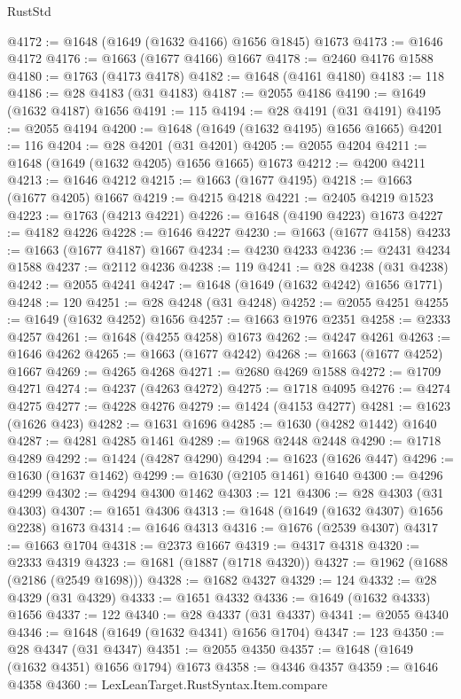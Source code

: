 \begin{lexlean}{RustStd}
\begin{coremodule}
@4172 := @1648 (@1649 (@1632 @4166) @1656 @1845) @1673
@4173 := @1646 @4172
@4176 := @1663 (@1677 @4166) @1667
@4178 := @2460 @4176 @1588
@4180 := @1763 (@4173 @4178)
@4182 := @1648 (@4161 @4180)
@4183 := 118
@4186 := @28 @4183 (@31 @4183)
@4187 := @2055 @4186
@4190 := @1649 (@1632 @4187) @1656
@4191 := 115
@4194 := @28 @4191 (@31 @4191)
@4195 := @2055 @4194
@4200 := @1648 (@1649 (@1632 @4195) @1656 @1665)
@4201 := 116
@4204 := @28 @4201 (@31 @4201)
@4205 := @2055 @4204
@4211 := @1648 (@1649 (@1632 @4205) @1656 @1665) @1673
@4212 := @4200 @4211
@4213 := @1646 @4212
@4215 := @1663 (@1677 @4195)
@4218 := @1663 (@1677 @4205) @1667
@4219 := @4215 @4218
@4221 := @2405 @4219 @1523
@4223 := @1763 (@4213 @4221)
@4226 := @1648 (@4190 @4223) @1673
@4227 := @4182 @4226
@4228 := @1646 @4227
@4230 := @1663 (@1677 @4158)
@4233 := @1663 (@1677 @4187) @1667
@4234 := @4230 @4233
@4236 := @2431 @4234 @1588
@4237 := @2112 @4236
@4238 := 119
@4241 := @28 @4238 (@31 @4238)
@4242 := @2055 @4241
@4247 := @1648 (@1649 (@1632 @4242) @1656 @1771)
@4248 := 120
@4251 := @28 @4248 (@31 @4248)
@4252 := @2055 @4251
@4255 := @1649 (@1632 @4252) @1656
@4257 := @1663 @1976 @2351
@4258 := @2333 @4257
@4261 := @1648 (@4255 @4258) @1673
@4262 := @4247 @4261
@4263 := @1646 @4262
@4265 := @1663 (@1677 @4242)
@4268 := @1663 (@1677 @4252) @1667
@4269 := @4265 @4268
@4271 := @2680 @4269 @1588
@4272 := @1709 @4271
@4274 := @4237 (@4263 @4272)
@4275 := @1718 @4095
@4276 := @4274 @4275
@4277 := @4228 @4276
@4279 := @1424 (@4153 @4277)
@4281 := @1623 (@1626 @423)
@4282 := @1631 @1696
@4285 := @1630 (@4282 @1442) @1640
@4287 := @4281 @4285 @1461
@4289 := @1968 @2448 @2448
@4290 := @1718 @4289
@4292 := @1424 (@4287 @4290)
@4294 := @1623 (@1626 @447)
@4296 := @1630 (@1637 @1462)
@4299 := @1630 (@2105 @1461) @1640
@4300 := @4296 @4299
@4302 := @4294 @4300 @1462
@4303 := 121
@4306 := @28 @4303 (@31 @4303)
@4307 := @1651 @4306
@4313 := @1648 (@1649 (@1632 @4307) @1656 @2238) @1673
@4314 := @1646 @4313
@4316 := @1676 (@2539 @4307)
@4317 := @1663 @1704
@4318 := @2373 @1667
@4319 := @4317 @4318
@4320 := @2333 @4319
@4323 := @1681 (@1887 (@1718 @4320))
@4327 := @1962 (@1688 (@2186 (@2549 @1698)))
@4328 := @1682 @4327
@4329 := 124
@4332 := @28 @4329 (@31 @4329)
@4333 := @1651 @4332
@4336 := @1649 (@1632 @4333) @1656
@4337 := 122
@4340 := @28 @4337 (@31 @4337)
@4341 := @2055 @4340
@4346 := @1648 (@1649 (@1632 @4341) @1656 @1704)
@4347 := 123
@4350 := @28 @4347 (@31 @4347)
@4351 := @2055 @4350
@4357 := @1648 (@1649 (@1632 @4351) @1656 @1794) @1673
@4358 := @4346 @4357
@4359 := @1646 @4358
@4360 := LexLeanTarget.RustSyntax.Item.compare

\end{coremodule}
\end{lexlean}
